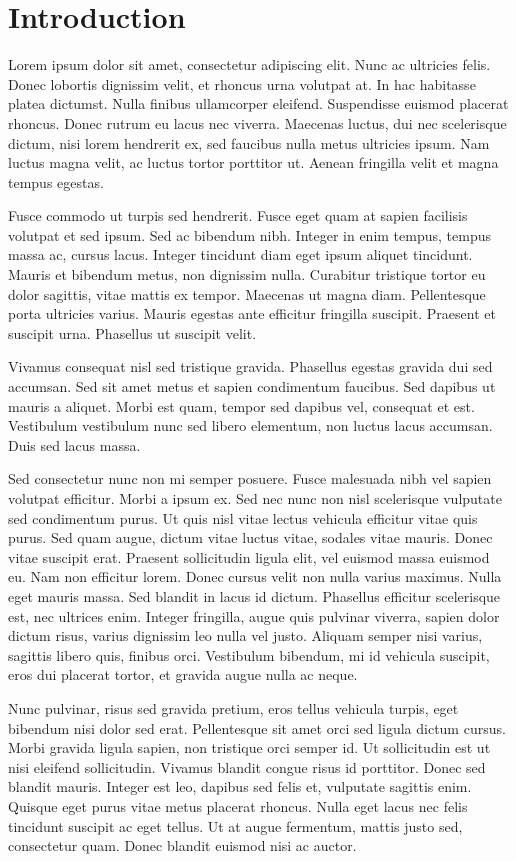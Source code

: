 \newpage
\section{Introduction}
\label{sec:introduction}

Lorem ipsum dolor sit amet, consectetur adipiscing elit. Nunc ac ultricies felis. Donec lobortis dignissim velit, et rhoncus urna volutpat at. In hac habitasse platea dictumst. Nulla finibus ullamcorper eleifend. Suspendisse euismod placerat rhoncus. Donec rutrum eu lacus nec viverra. Maecenas luctus, dui nec scelerisque dictum, nisi lorem hendrerit ex, sed faucibus nulla metus ultricies ipsum. Nam luctus magna velit, ac luctus tortor porttitor ut. Aenean fringilla velit et magna tempus egestas.

\medskip Fusce commodo ut turpis sed hendrerit. Fusce eget quam at sapien facilisis volutpat et sed ipsum. Sed ac bibendum nibh. Integer in enim tempus, tempus massa ac, cursus lacus. Integer tincidunt diam eget ipsum aliquet tincidunt. Mauris et bibendum metus, non dignissim nulla. Curabitur tristique tortor eu dolor sagittis, vitae mattis ex tempor. Maecenas ut magna diam. Pellentesque porta ultricies varius. Mauris egestas ante efficitur fringilla suscipit. Praesent et suscipit urna. Phasellus ut suscipit velit.

\medskip Vivamus consequat nisl sed tristique gravida. Phasellus egestas gravida dui sed accumsan. Sed sit amet metus et sapien condimentum faucibus. Sed dapibus ut mauris a aliquet. Morbi est quam, tempor sed dapibus vel, consequat et est. Vestibulum vestibulum nunc sed libero elementum, non luctus lacus accumsan. Duis sed lacus massa.

\medskip Sed consectetur nunc non mi semper posuere. Fusce malesuada nibh vel sapien volutpat efficitur. Morbi a ipsum ex. Sed nec nunc non nisl scelerisque vulputate sed condimentum purus. Ut quis nisl vitae lectus vehicula efficitur vitae quis purus. Sed quam augue, dictum vitae luctus vitae, sodales vitae mauris. Donec vitae suscipit erat. Praesent sollicitudin ligula elit, vel euismod massa euismod eu. Nam non efficitur lorem. Donec cursus velit non nulla varius maximus. Nulla eget mauris massa. Sed blandit in lacus id dictum. Phasellus efficitur scelerisque est, nec ultrices enim. Integer fringilla, augue quis pulvinar viverra, sapien dolor dictum risus, varius dignissim leo nulla vel justo. Aliquam semper nisi varius, sagittis libero quis, finibus orci. Vestibulum bibendum, mi id vehicula suscipit, eros dui placerat tortor, et gravida augue nulla ac neque.

\medskip Nunc pulvinar, risus sed gravida pretium, eros tellus vehicula turpis, eget bibendum nisi dolor sed erat. Pellentesque sit amet orci sed ligula dictum cursus. Morbi gravida ligula sapien, non tristique orci semper id. Ut sollicitudin est ut nisi eleifend sollicitudin. Vivamus blandit congue risus id porttitor. Donec sed blandit mauris. Integer est leo, dapibus sed felis et, vulputate sagittis enim. Quisque eget purus vitae metus placerat rhoncus. Nulla eget lacus nec felis tincidunt suscipit ac eget tellus. Ut at augue fermentum, mattis justo sed, consectetur quam. Donec blandit euismod nisi ac auctor.